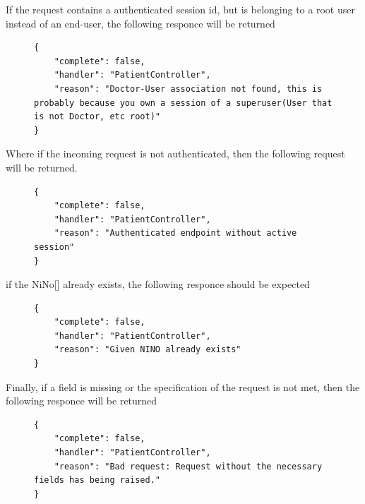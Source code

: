 					If the request contains a authenticated session id, but is belonging to a root user instead of an end-user, the
					following responce will be returned
					\begin{figure}[H]
						\iftrue
						\begin{lstlisting}[]
{
	"complete": false,
	"handler": "PatientController",
	"reason": "Doctor-User association not found, this is probably because you own a session of a superuser(User that is not Doctor, etc root)"
}
						\end{lstlisting}
					\end{figure}
					Where if the incoming request is not authenticated, then the following request will be returned.
					\begin{figure}[H]
						\iftrue
						\begin{lstlisting}[]
{
	"complete": false,
	"handler": "PatientController",
	"reason": "Authenticated endpoint without active session"
}
						\end{lstlisting}
					\end{figure}
					if the NiNo[\cite{nino-format}] already exists, the following responce should be expected
					\begin{figure}[H]
						\iftrue
						\begin{lstlisting}[]
{
	"complete": false,
	"handler": "PatientController",
	"reason": "Given NINO already exists"
}
						\end{lstlisting}
					\end{figure}
					Finally, if a field is missing or the specification of the request is not met, then the following responce will be returned
					\begin{figure}[H]
						\iftrue
						\begin{lstlisting}[]
{
	"complete": false,
	"handler": "PatientController",
	"reason": "Bad request: Request without the necessary fields has being raised."
}					
						\end{lstlisting}
					\end{figure}
